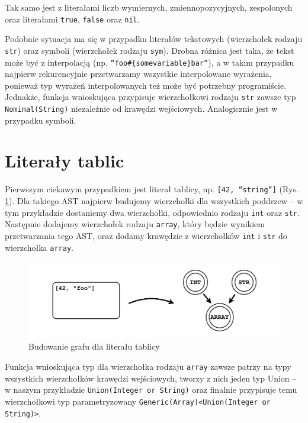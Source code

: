 \documentclass[shortabstract,mgr]{iithesis}
\begin{document}
Tak samo jest z literałami liczb wymiernych, zmiennopozycyjnych, zespolonych oraz literałami \texttt{true}, \texttt{false} oraz \texttt{nil}.

Podobnie sytuacja ma się w przypadku literałów tekstowych (wierzchołek rodzaju \texttt{str}) oraz symboli (wierzchołek rodzaju \texttt{sym}). Drobna różnica jest taka, że tekst może być z interpolacją (np. \texttt{``foo\#\{somevariable\}bar''}), a w takim przypadku najpierw rekurencyjnie przetwarzamy wszystkie interpolowane wyrażenia, ponieważ typ wyrażeń interpolowanych też może być potrzebny programiście. Jednakże, funkcja wnioskująca przypisuje wierzchołkowi rodzaju \texttt{str} zawsze typ \texttt{Nominal(String)} niezależnie od krawędzi wejściowych. Analogicznie jest w przypadku symboli.

\section{Literały tablic}

Pierwszym ciekawym przypadkiem jest literał tablicy, np. \texttt{[42, ``string'']} (Rys. \ref{fig:graph-array}). Dla takiego AST najpierw budujemy wierzchołki dla wszystkich poddrzew -- w tym przykładzie dostaniemy dwa wierzchołki, odpowiednio rodzaju \texttt{int} oraz \texttt{str}. Następnie dodajemy wierzchołek rodzaju \texttt{array}, który będzie wynikiem przetwarzania tego AST, oraz dodamy krawędzie z wierzchołków \texttt{int} i \texttt{str} do wierzchołka \texttt{array}.

\begin{figure}[htb]
	\centering
	\includegraphics[scale=0.4]{imgs/msc-array.png}
	\caption{Budowanie grafu dla literału tablicy}
	\label{fig:graph-array}
\end{figure}

Funkcja wnioskująca typ dla wierzchołka rodzaju \texttt{array} zawsze patrzy na typy wszystkich wierzchołków krawędzi wejściowych, tworzy z nich jeden typ Union -- w naszym przykładzie \texttt{Union(Integer or String)} oraz finalnie przypisuje temu wierzchołkowi typ parametryzowany \texttt{Generic(Array)<Union(Integer or String)>}.
\end{document}
